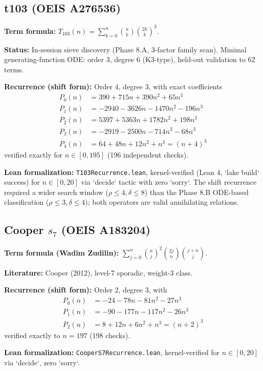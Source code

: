 \documentclass[aps,prd,twocolumn,nofootinbib,superscriptaddress,10pt]{revtex4-2}
\begin{document}
\subsection{t103 (OEIS A276536)}

\textbf{Term formula:} $T_{103}(n) = \sum_{k=0}^{n} \binom{n}{k} \binom{2k}{k}^3$.

\textbf{Status:} In-session sieve discovery (Phase 8.A, 3-factor family scan). Minimal generating-function ODE: order 3, degree 6 (K3-type), held-out validation to 62 terms.

\textbf{Recurrence (shift form):} Order 4, degree 3, with exact coefficients
\begin{align}
P_0(n) &= 390 + 715n + 390n^2 + 65n^3 \\
P_1(n) &= -2940 - 3626n - 1470n^2 - 196n^3 \\
P_2(n) &= 5397 + 5363n + 1782n^2 + 198n^3 \\
P_3(n) &= -2919 - 2500n - 714n^2 - 68n^3 \\
P_4(n) &= 64 + 48n + 12n^2 + n^3 = (n+4)^3
\end{align}
verified exactly for $n \in [0,195]$ (196 independent checks).

\textbf{Lean formalization:} \texttt{T103Recurrence.lean}, kernel-verified (Lean 4, `lake build` success) for $n \in [0,20]$ via `decide` tactic with zero `sorry`. The shift recurrence required a wider search window ($\rho \le 4, \delta \le 8$) than the Phase 8.B ODE-based classification ($\rho \le 3, \delta \le 4$); both operators are valid annihilating relations.

\subsection{Cooper $s_7$ (OEIS A183204)}

\textbf{Term formula (Wadim Zudilin):} $\sum_{j=0}^{n} \binom{n}{j}^2 \binom{2j}{n} \binom{j+n}{j}$.

\textbf{Literature:} Cooper (2012), level-7 sporadic, weight-3 class.

\textbf{Recurrence (shift form):} Order 2, degree 3, with
\begin{align}
P_0(n) &= -24 - 78n - 81n^2 - 27n^3 \\
P_1(n) &= -90 - 177n - 117n^2 - 26n^3 \\
P_2(n) &= 8 + 12n + 6n^2 + n^3 = (n+2)^3
\end{align}
verified exactly to $n = 197$ (198 checks).

\textbf{Lean formalization:} \texttt{CooperS7Recurrence.lean}, kernel-verified for $n \in [0,20]$ via `decide`, zero `sorry`.
\end{document}
